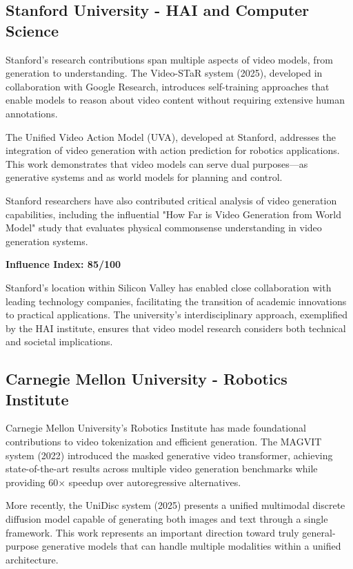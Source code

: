 \subsection{Stanford University - HAI and Computer Science}

Stanford's research contributions span multiple aspects of video models, from generation to understanding. The Video-STaR system (2025), developed in collaboration with Google Research, introduces self-training approaches that enable models to reason about video content without requiring extensive human annotations.

The Unified Video Action Model (UVA), developed at Stanford, addresses the integration of video generation with action prediction for robotics applications. This work demonstrates that video models can serve dual purposes—as generative systems and as world models for planning and control.

Stanford researchers have also contributed critical analysis of video generation capabilities, including the influential "How Far is Video Generation from World Model" study that evaluates physical commonsense understanding in video generation systems.

\textbf{Influence Index: 85/100}

Stanford's location within Silicon Valley has enabled close collaboration with leading technology companies, facilitating the transition of academic innovations to practical applications. The university's interdisciplinary approach, exemplified by the HAI institute, ensures that video model research considers both technical and societal implications.

\subsection{Carnegie Mellon University - Robotics Institute}

Carnegie Mellon University's Robotics Institute has made foundational contributions to video tokenization and efficient generation. The MAGVIT system (2022) introduced the masked generative video transformer, achieving state-of-the-art results across multiple video generation benchmarks while providing 60× speedup over autoregressive alternatives.

More recently, the UniDisc system (2025) presents a unified multimodal discrete diffusion model capable of generating both images and text through a single framework. This work represents an important direction toward truly general-purpose generative models that can handle multiple modalities within a unified architecture.

